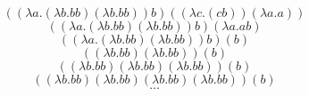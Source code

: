 \documentclass[12pt,a4paper]{scrartcl}
\begin{document}
\[  (({\lambda} a.({\lambda} b.bb)({\lambda} b.bb))b)(({\lambda} c.(cb))({\lambda} a.a))  \]
\[  (({\lambda} a.({\lambda} b.bb)({\lambda} b.bb))b)({\lambda} a. a b)\]
\[  (({\lambda} a.({\lambda} b.bb)({\lambda} b.bb))b)(b)\]
\[  (({\lambda} b.bb)({\lambda} b.bb))(b)\]
\[  (({\lambda} b.bb)({\lambda} b.bb)({\lambda} b.bb))(b)\]
\[  (({\lambda} b.bb)({\lambda} b.bb)({\lambda} b.bb)({\lambda} b.bb))(b)\]
\[ ... \]
\end{document}
